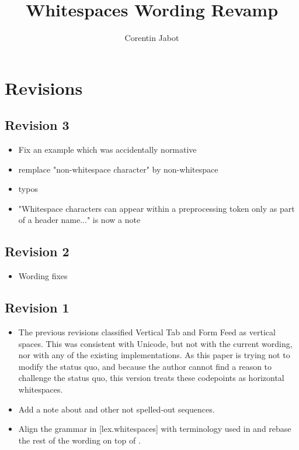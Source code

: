 \documentclass{wg21}
\title{Whitespaces Wording Revamp}
\author{Corentin Jabot}{corentin.jabot@gmail.com}
\begin{document}
\maketitle

\section{Revisions}

\subsection*{Revision 3}
\begin{itemize}
    \item Fix an example which was accidentally normative
    \item remplace "non-whitespace character" by non-whitespace
    \item typos
    \item "Whitespace characters can appear within a preprocessing token only as part of a header name..." is now a note
\end{itemize}

\subsection*{Revision 2}
\begin{itemize}
    \item Wording fixes
\end{itemize}

\subsection*{Revision 1}
\begin{itemize}
    \item The previous revisions classified Vertical Tab and Form Feed as vertical spaces. This was consistent with Unicode, but not with the current wording, nor with any of the existing implementations. As this paper is trying not to modify the status quo, and because the author cannot find a reason to challenge the status quo, this version treats these codepoints as horizontal whitespaces.
    \item Add a note about  and other not spelled-out sequences.
    \item Align the grammar in [lex.whitespaces] with terminology used in  and rebase the rest of the wording on top of  . 
\end{itemize}
\end{document}
